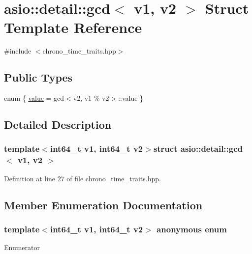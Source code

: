 \hypertarget{structasio_1_1detail_1_1gcd}{}\section{asio\+:\+:detail\+:\+:gcd$<$ v1, v2 $>$ Struct Template Reference}
\label{structasio_1_1detail_1_1gcd}


{\ttfamily \#include $<$chrono\+\_\+time\+\_\+traits.\+hpp$>$}

\subsection*{Public Types}
\begin{DoxyCompactItemize}
\item 
enum \{ \hyperlink{structasio_1_1detail_1_1gcd_a32127e6e61dc395a21be843f40a8e851a4e8b4d036a269ed9f19f884fe448cc5f}{value} = gcd$<$v2, v1 \% v2$>$\+:\+:value
 \}
\end{DoxyCompactItemize}


\subsection{Detailed Description}
\subsubsection*{template$<$int64\+\_\+t v1, int64\+\_\+t v2$>$struct asio\+::detail\+::gcd$<$ v1, v2 $>$}



Definition at line 27 of file chrono\+\_\+time\+\_\+traits.\+hpp.



\subsection{Member Enumeration Documentation}
\hypertarget{structasio_1_1detail_1_1gcd_a32127e6e61dc395a21be843f40a8e851}{}\subsubsection[{anonymous enum}]{\setlength{\rightskip}{0pt plus 5cm}template$<$int64\+\_\+t v1, int64\+\_\+t v2$>$ anonymous enum}\label{structasio_1_1detail_1_1gcd_a32127e6e61dc395a21be843f40a8e851}
\begin{Desc}
\item[Enumerator]\par
\begin{description}
\item[{\em 
\hypertarget{structasio_1_1detail_1_1gcd_a32127e6e61dc395a21be843f40a8e851a4e8b4d036a269ed9f19f884fe448cc5f}{}value\label{structasio_1_1detail_1_1gcd_a32127e6e61dc395a21be843f40a8e851a4e8b4d036a269ed9f19f884fe448cc5f}
}]\end{description}
\end{Desc}


